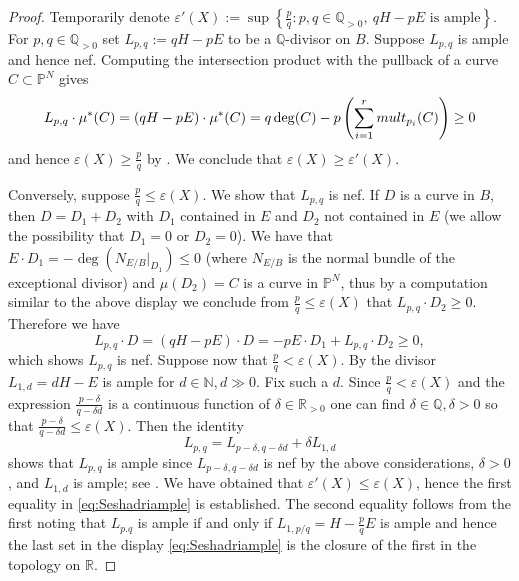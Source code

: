 \documentclass[12pt, reqno]{amsart}
\numberwithin{equation}{section}
\def\e{\ensuremath{\varepsilon}}
\newcommand{\N}{{\mathbb N}}
\renewcommand{\P}{{\mathbb P}}
\newcommand{\Q}{{\mathbb Q}}
\newcommand{\R}{{\mathbb R}}
\theoremstyle{plain} %
\theoremstyle{definition}
\newtheorem{rem}[thm]{Remark}
\theoremstyle{remark}
\begin{document}
\begin{proof}
Temporarily denote $\e'(X):=\sup \left\{ \frac{p}{q} : p,q\in \Q_{>0},  \ qH-p E \text{ is ample}\right \}$.
For $p,q\in\Q_{>0}$ set $L_{p,q}:=qH-p E$ to be a $\Q$-divisor on $B$. Suppose $L_{p,q}$ is ample and hence nef. Computing the intersection product with the pullback of a curve $C\subset \P^N$ gives
\[
L_{p,q}\cdot \mu^*(C)=(qH-p E)\cdot \mu^*(C)= q\deg(C)-p\left( \sum_{i=1}^r {\rm mult}_{p_i}(C)\right)\geq 0
\]
and hence $\e(X)\geq \frac{p}{q}$ by . We conclude that $\e(X)\geq \e'(X)$.

Conversely, suppose $\frac{p}{q}\leq \e(X)$. We show  that $L_{p,q}$ is nef. If $D$ is a curve in $B$, then $D=D_1+D_2$ with $D_1$ contained in $E$ and $D_2$ not contained in $E$ (we allow the possibility that $D_1=0$ or $D_2=0$). We have that $E\cdot D_1=- \deg(N_{E/B}|_{D_1})\leq0$ (where $N_{E/B}$ is the normal bundle of the exceptional divisor) and $\mu(D_2)=C$ is a curve in $\P^N$, thus by a computation similar to the  above display we conclude from $\frac{p}{q}\leq \e(X)$ that $L_{p,q}\cdot D_2\geq 0$. Therefore we have
\[
L_{p,q} \cdot D=(qH-p E)\cdot D= -p E\cdot D_1+L_{p,q}\cdot D_2 \geq 0,
\]
which shows $L_{p,q}$ is nef.
Suppose now that $\frac{p}{q}<\e(X)$. By  \cite[Section II, Proposition 7.10]{Hartshorne} the divisor $L_{1,d}=dH-E$ is ample for $d\in \N, d\gg0$. Fix such a $d$. Since $\frac{p}{q}<\e(X)$ and the expression $\frac{p-\delta}{q-\delta d}$ is a continuous function of $\delta\in\R_{>0}$ one can find $\delta\in \Q, \delta>0$ so that $\frac{p-\delta}{q-\delta d}\leq \e(X)$. Then the identity
\[
L_{p,q}= L_{p-\delta ,q-\delta d}+\delta L_{1,d}
\]
shows that $L_{p,q}$ is ample since  $L_{p-\delta ,q-\delta d}$ is nef by the above considerations, $\delta>0$,  and $L_{1,d}$ is ample; see \cite[Corollary 1.4.10]{Laz04}. We have obtained that $\e'(X)\leq \e(X)$, hence the first equality in \eqref{eq:Seshadriample} is established.
The second equality follows from the first noting that $L_{p.q}$ is ample if and only if $L_{1,p/q}=H-\frac{p}{q}E$ is ample and hence the last set in the display \eqref{eq:Seshadriample} is the closure of the first in the topology on $\R$. 
\end{proof}

\end{document}
